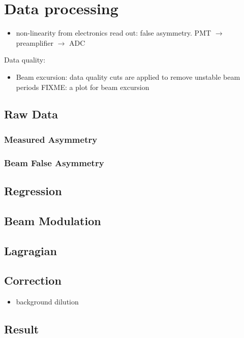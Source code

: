 \chapter{Data processing}
\begin{itemize}
    \item non-linearity from electronics read out: false asymmetry. PMT $\rightarrow$
	preamplifier $\rightarrow$ ADC
\end{itemize}

Data quality:
\begin{itemize}
    \item Beam excursion: data quality cuts are applied to remove unstable beam periods
	FIXME: a plot for beam excursion
\end{itemize}

\section{Raw Data}
\subsection{Measured Asymmetry}
\subsection{Beam False Asymmetry}

\section{Regression}

\section{Beam Modulation}

\section{Lagragian}

\section{Correction}
\begin{itemize}
    \item background dilution
\end{itemize}
\section{Result}
